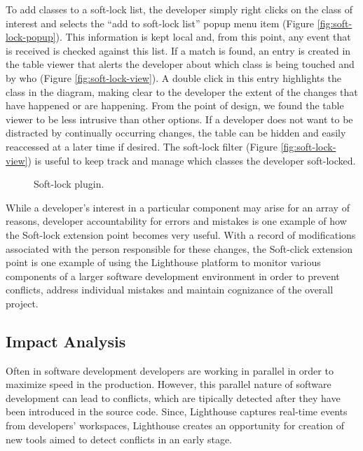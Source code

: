 \documentclass[10pt, conference, compsocconf]{IEEEtran}
\begin{document}
To add classes to a soft-lock list, the developer simply right clicks on the class of interest and selects the ``add to soft-lock list'' popup menu item (Figure \ref{fig:soft-lock-popup}). This information is kept local and, from this point, any event that is received is checked against this list. If a match is found, an entry is created in the table viewer that alerts the developer about which class is being touched and by who  (Figure \ref{fig:soft-lock-view}). A double click in this entry highlights the class in the diagram, making clear to the developer the extent of the changes that have happened or are happening. From the point of design, we found the table viewer to be less intrusive than other options.  If a developer does not want to be distracted by continually occurring changes, the table can be hidden and easily reaccessed at a later time if desired. The soft-lock filter  (Figure \ref{fig:soft-lock-view}) is useful to keep track and manage which classes the developer soft-locked.

\begin{figure*}[!t]
 \centering
 \hfil
\hfil
{}
\caption{Soft-lock plugin.}
\label{fig:soft-lock}
\end{figure*}

While a developer's interest in a particular component may arise for an array of reasons, developer accountability for errors and mistakes is one example of how the Soft-lock extension point becomes very useful.  With a record of modifications associated with the person responsible for these changes, the Soft-click extension point is one example of using the Lighthouse platform to monitor various components of a larger software development environment in order to prevent conflicts, address individual mistakes and maintain cognizance of the overall project.  

\subsection{Impact Analysis}

Often in software development developers are working in parallel in order to maximize speed in the production. However, this parallel nature of software development can lead to conflicts, which are tipically detected after they have been introduced in the source code. Since, Lighthouse captures real-time events from developers' workspaces, Lighthouse creates an opportunity for creation of new tools aimed to detect conflicts in an early stage. 
\end{document}
